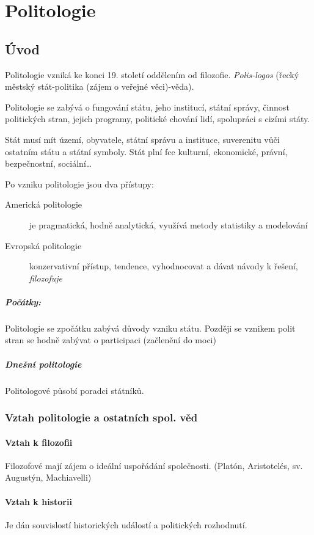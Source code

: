 \documentclass[10pt,a4paper,
twoside,%
]{report}
\begin{document}
\chapter{Politologie}
\section{Úvod}
Politologie vzniká ke konci 19. století oddělením od f\mbox{}ilozofie. \emph{Polis-logos} (řecký městský stát-politika (zájem o veřejné věci)-věda).

Politologie se zabývá o fungování státu, jeho institucí, státní správy, činnost politických stran, jejich programy, politické chování lidí, spolupráci s cizími státy.

Stát musí mít území, obyvatele, státní správu a instituce, suverenitu vůči ostatním státu a státní symboly.
Stát plní fce kulturní, ekonomické, právní, bezpečnostní, sociální\ldots

Po vzniku politologie jsou dva přístupy:
\begin{description}
\item[Americká politologie] je pragmatická, hodně analytická, využívá metody statistiky a modelování
\item[Evropská politologie] konzervativní přístup, tendence, vyhodnocovat a dávat návody k řešení, \emph{filozofuje}
\end{description}
\paragraph{Počátky:} Politologie se zpočátku zabývá důvody vzniku státu. Později se vznikem polit stran se hodně zabývat o participaci (začlenění do moci)

\paragraph{Dnešní politologie} Politologové působí poradci státníků. 
\subsection{Vztah politologie a ostatních spol. věd}
\subsubsection{Vztah k filozofii}
Filozofové mají zájem o ideální uspořádání společnosti. (Platón, Aristotelés, sv. Augustýn, Machiavelli)
\subsubsection{Vztah k historii}
Je dán souvislostí historických událostí a politických rozhodnutí. 
\end{document}
